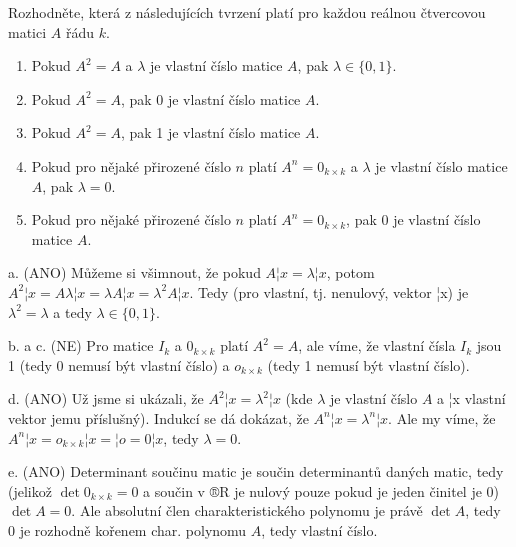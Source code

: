\documentclass[10pt]{article}                   %
\begin{document}
\begin{priklad}[5.1]
    Rozhodněte, která z následujících tvrzení platí pro každou reálnou čtvercovou matici $A$ řádu $k$.

    \renewcommand{\theenumi}{\alph{enumi}}
    \begin{enumerate}
        \item Pokud $A^2 = A$ a $\lambda$ je vlastní číslo matice $A$, pak $\lambda \in \{0, 1\}$.
        \item Pokud $A^2 = A$, pak 0 je vlastní číslo matice $A$.
        \item Pokud $A^2 = A$, pak 1 je vlastní číslo matice $A$.
        \item Pokud pro nějaké přirozené číslo $n$ platí $A^n = 0_{k \times k}$ a $\lambda$ je vlastní číslo matice $A$, pak $\lambda = 0$.
        \item Pokud pro nějaké přirozené číslo $n$ platí $A^n = 0_{k \times k}$, pak 0 je vlastní číslo matice $A$.
    \end{enumerate}

    \begin{reseni}
        a. (ANO) Můžeme si všimnout, že pokud $A¦x = \lambda ¦x$, potom $A^2¦x = A\lambda¦x = \lambda A¦x = \lambda^2 A¦x$. Tedy (pro vlastní, tj. nenulový, vektor ¦x) je $\lambda^2 = \lambda$ a tedy $\lambda \in \{0, 1\}$. 

        b. a c. (NE) Pro matice $I_k$ a $0_{k \times k}$ platí $A^2 = A$, ale víme, že vlastní čísla $I_k$ jsou 1 (tedy 0 nemusí být vlastní číslo) a $o_{k \times k}$ (tedy 1 nemusí být vlastní číslo).

        d. (ANO) Už jsme si ukázali, že $A^2¦x = \lambda^2¦x$ (kde $\lambda$ je vlastní číslo $A$ a ¦x vlastní vektor jemu příslušný). Indukcí se dá dokázat, že $A^n¦x = \lambda^n¦x$. Ale my víme, že $A^n¦x = o_{k \times k}¦x = ¦o = 0¦x$, tedy $\lambda = 0$.

        e. (ANO) Determinant součinu matic je součin determinantů daných matic, tedy (jelikož $\det 0_{k\times k} = 0$ a součin v ®R je nulový pouze pokud je jeden činitel je 0) $\det A = 0$. Ale absolutní člen charakteristického polynomu je právě $\det A$, tedy 0 je rozhodně kořenem char. polynomu $A$, tedy vlastní číslo.
    \end{reseni}
\end{priklad}

\pagebreak
\end{document}
